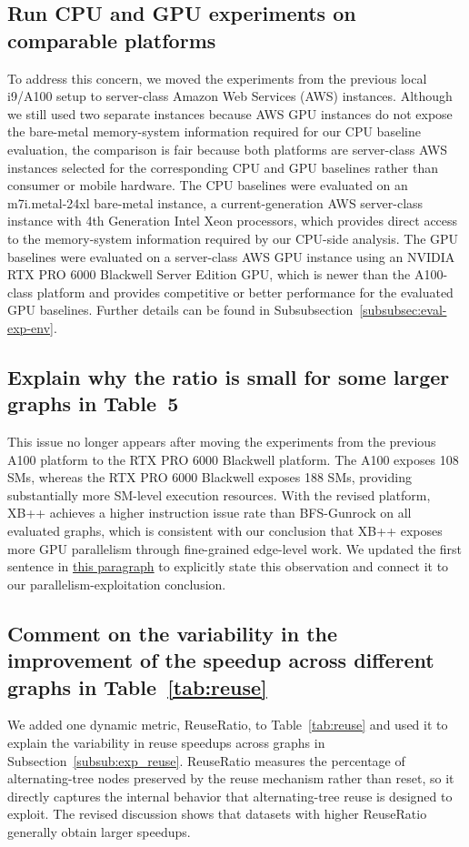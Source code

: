 \subsection{Run CPU and GPU experiments on comparable platforms}
\label{subsec:rev-fair-platform}
To address this concern, we moved the experiments from the previous local i9/A100 setup to server-class Amazon Web Services (AWS) instances. Although we still used two separate instances because AWS GPU instances do not expose the bare-metal memory-system information required for our CPU baseline evaluation, the comparison is fair because both platforms are server-class AWS instances selected for the corresponding CPU and GPU baselines rather than consumer or mobile hardware. The CPU baselines were evaluated on an m7i.metal-24xl bare-metal instance, a current-generation AWS server-class instance with 4th Generation Intel Xeon processors, which provides direct access to the memory-system information required by our CPU-side analysis. The GPU baselines were evaluated on a server-class AWS GPU instance using an NVIDIA RTX PRO 6000 Blackwell Server Edition GPU, which is newer than the A100-class platform and provides competitive or better performance for the evaluated GPU baselines. Further details can be found in Subsubsection~\ref{subsubsec:eval-exp-env}.

\subsection{Explain why the ratio is small for some larger graphs in Table~5}
\label{subsec:rev-inst-ratio}
This issue no longer appears after moving the experiments from the previous A100 platform to the RTX PRO 6000 Blackwell platform. The A100 exposes 108 SMs, whereas the RTX PRO 6000 Blackwell exposes 188 SMs, providing substantially more SM-level execution resources. With the revised platform, XB++ achieves a higher instruction issue rate than BFS-Gunrock on all evaluated graphs, which is consistent with our conclusion that XB++ exposes more GPU parallelism through fine-grained edge-level work. We updated the first sentence in 
\hyperref[para:inst_gpu]{this paragraph} to explicitly state this observation and connect it to our parallelism-exploitation conclusion.

\subsection{Comment on the variability in the improvement of the speedup across different graphs in Table~\ref{tab:reuse}}
\label{subsec:rev-reuse-variability}
We added one dynamic metric, ReuseRatio, to Table~\ref{tab:reuse} and used it to explain the variability in reuse speedups across graphs in Subsection~\ref{subsub:exp_reuse}. 
ReuseRatio measures the percentage of alternating-tree nodes preserved by the reuse mechanism rather than reset, so it directly captures the internal behavior that alternating-tree reuse is designed to exploit. 
The revised discussion shows that datasets with higher ReuseRatio generally obtain larger speedups.

